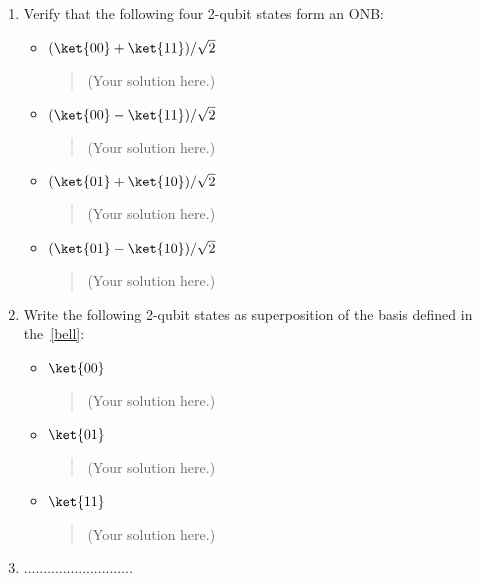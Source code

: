 \documentclass[a4paper,10pt,reqno,nonamelimits]{article}
\begin{document}
\begin{enumerate}[label=(\alph*)]
\item\label{bell} Verify that the following four 2-qubit states form an ONB:
  \begin{itemize}
  \item $( \ket{00}+\ket{11} )/\sqrt2$

    \begin{quotation}\color{blue}
      (Your solution here.)
    \end{quotation}

  \item $( \ket{00}-\ket{11} )/\sqrt2$

    \begin{quotation}\color{blue}
      (Your solution here.)
    \end{quotation}

  \item $( \ket{01}+\ket{10} )/\sqrt2$

    \begin{quotation}\color{blue}
      (Your solution here.)
    \end{quotation}

  \item $( \ket{01}-\ket{10} )/\sqrt2$

    \begin{quotation}\color{blue}
      (Your solution here.)
    \end{quotation}

  \end{itemize}
\item Write the following 2-qubit states as superposition of the basis defined in the~\ref{bell}:
  \begin{itemize}
  \item $\ket{00}$
    \begin{quotation}\color{blue}
      (Your solution here.)
    \end{quotation}
  \item $\ket{01}$
    \begin{quotation}\color{blue}
      (Your solution here.)
    \end{quotation}
  \item $\ket{11}$
    \begin{quotation}\color{blue}
      (Your solution here.)
    \end{quotation}
  \end{itemize}
\item ............................
\end{enumerate}
\end{document}
